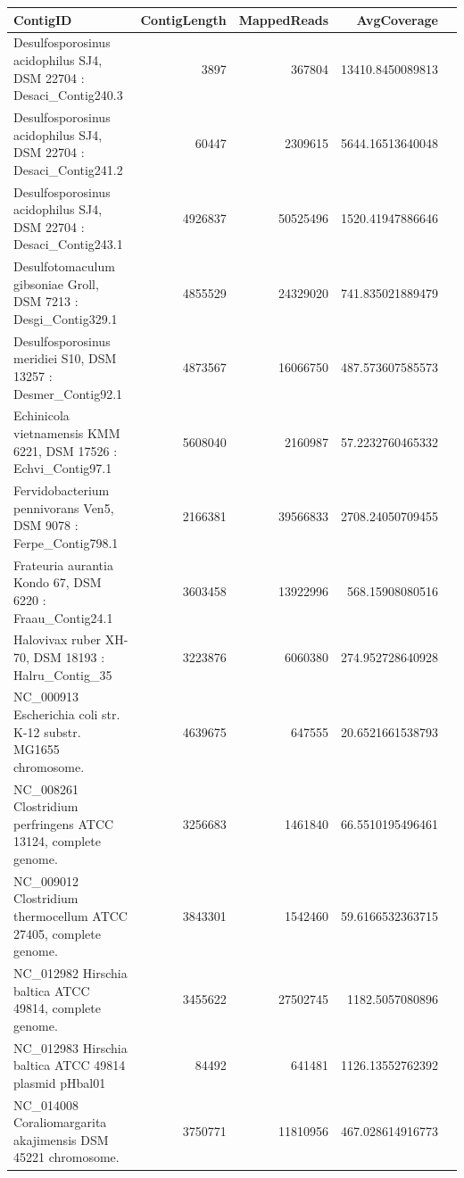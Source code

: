 \documentclass{bioinfo2}
\begin{document}

\newpage

\begin{table}[p]
{\footnotesize
\begin{tabular}{lrrrr}
\toprule
ContigID & ContigLength & MappedReads & AvgCoverage \\ %
\midrule
Desulfosporosinus acidophilus SJ4, DSM 22704 : Desaci\_Contig240.3 & 3897 & 367804 & 13410.8450089813 \\
Desulfosporosinus acidophilus SJ4, DSM 22704 : Desaci\_Contig241.2 & 60447 & 2309615 & 5644.16513640048 \\
Desulfosporosinus acidophilus SJ4, DSM 22704 : Desaci\_Contig243.1 & 4926837 & 50525496 & 1520.41947886646 \\
\hline
Desulfotomaculum gibsoniae Groll, DSM 7213 : Desgi\_Contig329.1 & 4855529 & 24329020 & 741.835021889479 \\
\hline
Desulfosporosinus meridiei S10, DSM 13257 : Desmer\_Contig92.1 & 4873567 & 16066750 & 487.573607585573 \\
\hline
Echinicola vietnamensis KMM 6221, DSM 17526 : Echvi\_Contig97.1 & 5608040 & 2160987 & 57.2232760465332 \\
\hline
Fervidobacterium pennivorans Ven5, DSM 9078 : Ferpe\_Contig798.1 & 2166381 & 39566833 & 2708.24050709455 \\
\hline
Frateuria aurantia Kondo 67, DSM 6220 : Fraau\_Contig24.1 & 3603458 & 13922996 & 568.15908080516 \\
\hline
Halovivax ruber XH-70, DSM 18193 : Halru\_Contig\_35 & 3223876 & 6060380 & 274.952728640928 \\
\hline
NC\_000913 Escherichia coli str. K-12 substr. MG1655 chromosome. & 4639675 & 647555 & 20.6521661538793 \\
\hline
NC\_008261 Clostridium perfringens ATCC 13124, complete genome. & 3256683 & 1461840 & 66.5510195496461 \\
\hline
NC\_009012 Clostridium thermocellum ATCC 27405, complete genome. & 3843301 & 1542460 & 59.6166532363715 \\
\hline
NC\_012982 Hirschia baltica ATCC 49814, complete genome. & 3455622 & 27502745 & 1182.5057080896 \\
NC\_012983 Hirschia baltica ATCC 49814 plasmid pHbal01 & 84492 & 641481 & 1126.13552762392 \\
\hline
NC\_014008 Coraliomargarita akajimensis DSM 45221 chromosome. & 3750771 & 11810956 & 467.028614916773 \\

\end{tabular}}
\end{table}
\end{document}
